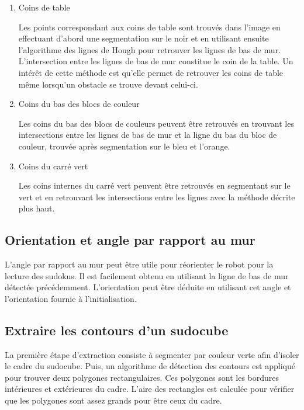 \begin{enumerate}
\item{Coins de table}

Les points correspondant aux coins de table sont trouvés dans l'image en effectuant d'abord une segmentation sur le noir et en utilisant ensuite l'algorithme des lignes de Hough pour retrouver les lignes de bas de mur. L'intersection entre les lignes de bas de mur constitue le coin de la table. Un intérêt de cette méthode est qu'elle permet de retrouver les coins de table même lorsqu'un obstacle se trouve devant celui-ci.

\item{Coins du bas des blocs de couleur}

Les coins du bas des blocs de couleurs peuvent être retrouvés en trouvant les intersections entre les lignes de bas de mur et la ligne du bas du bloc de couleur, trouvée après segmentation sur le bleu et l'orange.

\item{Coins du carré vert}

Les coins internes du carré vert peuvent être retrouvés en segmentant sur le vert et en retrouvant les intersections entre les lignes avec la méthode décrite plus haut.
\end{enumerate}

\subsection{Orientation et angle par rapport au mur}

L'angle par rapport au mur peut être utile pour réorienter le robot pour la lecture des sudokus. Il est facilement obtenu en utilisant la ligne de bas de mur détectée précédemment. L'orientation peut être déduite en utilisant cet angle et l'orientation fournie à l'initialisation.

\subsection{Extraire les contours d'un sudocube}

La première étape d'extraction consiste à segmenter par couleur verte afin d'isoler le cadre du sudocube. Puis, un algorithme de détection des contours est appliqué pour trouver deux polygones rectangulaires. Ces polygones sont les bordures intérieures et extérieures du cadre. L'aire des rectangles est calculée pour vérifier que les polygones sont assez grands pour être ceux du cadre.

